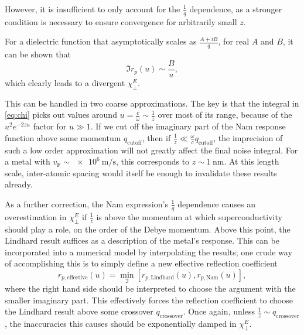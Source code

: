 \documentclass[%
 preprint,
 amsmath,amssymb,
 aps,
]{revtex4-2}
\newcommand{\vf}{v_{\mathrm{F}}}
\begin{document}
However, it is insufficient to only account for the $\frac{1}{q}$ dependence, as a stronger condition is necessary to ensure convergence for arbitrarily small $z$.

For a dielectric function that asymptotically scales as $\frac{A + i B}{q}$, for real $A$ and $B$, it can be shown that
\begin{equation}
	\Im r_p(u) \sim \frac{B}{u},
\end{equation}
which clearly leads to a divergent $\chi_\perp^E$.

This can be handled in two coarse approximations.
The key is that the integral in \eqref{eq:chi} picks out values around $u = \frac{c}{\omega} \sim \frac{1}{z}$ over most of its range, because of the $u^2 e^{-2 z u}$ factor for $u \gg 1$.
If we cut off the imaginary part of the Nam response function above some momentum $q_{\mathrm{cutoff}}$, then if $\frac{1}{z} \ll \frac{\omega}{c} q_{\mathrm{cutoff}}$, the imprecision of such a low order approximation will not greatly affect the final noise integral.
For a metal with $\vf \sim \SI{e6}{\m\per\s}$, this corresponds to $z \sim \SI{1}{\nm}$.
At this length scale, inter-atomic spacing would itself be enough to invalidate these results already.

As a further correction, the Nam expression's $\frac{1}{q}$ dependence causes an overestimation in $\chi_\perp^E$ if $\frac{1}{z}$ is above the momentum at which superconductivity should play a role, on the order of the Debye momentum.
Above this point, the Lindhard result suffices as a description of the metal's response.
This can be incorporated into a numerical model by interpolating the results;
one crude way of accomplishing this is to simply define a new effective reflection coefficient
\begin{equation}
	r_{p, \mathrm{effective}}(u) = \min_{\Im}\left[r_{p, \mathrm{Lindhard}}\left(u\right), r_{p, \mathrm{Nam}}\left(u\right)\right],
\end{equation}
where the right hand side should be interpreted to choose the argument with the smaller imaginary part.
This effectively forces the reflection coefficient to choose the Lindhard result above some crossover $q_{\mathrm{crossover}}$.
Once again, unless $\frac{1}{z} \sim q_{\mathrm{crossover}}$, the inaccuracies this causes should be exponentially damped in $\chi_\perp^E$.
\end{document}
